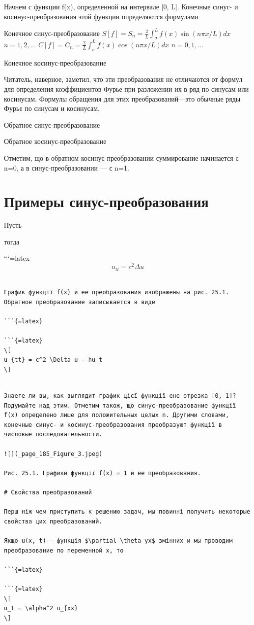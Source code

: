 \documentclass[
]{article}
\begin{document}
Начнем с функции f(x), определенной на интервале {[}0, L{]}. Конечные
синус- и косинус-преобразования этой функции определяются формулами

Конечное синус-преобразование
\(S[f] = S_n = \frac{2}{L} \int_{\sigma}^{L} f(x) \sin(n\pi x/L) dx\)
\(n = 1, 2, \dots\)
\(C[f] = C_n = \frac{2}{L} \int_{\sigma}^{L} f(x) \cos(n\pi x/L) dx\)
\(n = 0, 1, \dots\)

Конечное косинус-преобразование

Читатель, наверное, заметил, что эти преобразования не отличаются от
формул для определения коэффициентов Фурье при разложении их в ряд по
синусам или косинусам. Формулы обращения для этих преобразований---это
обычные ряды Фурье по синусам и косинусам.

Обратное синус-преобразование

Обратное косинус-преобразование

Отметим, що в обратном косинус-преобразовании суммирование начинается с
n=0, а в синус-преобразовании --- с n=1.

\section{Примеры
синус-преобразования}\label{ux43fux440ux438ux43cux435ux440ux44b-ux441ux438ux43dux443ux441-ux43fux440ux435ux43eux431ux440ux430ux437ux43eux432ux430ux43dux438ux44f}

Пусть

тогда

```{=latex}
\[
u_{tt} = c^2 \Delta u
\]

\begin{verbatim}

График функції f(x) и ее преобразования изображены на рис. 25.1. Обратное преобразование записывается в виде

```{=latex}

```{=latex}
\[
u_{tt} = c^2 \Delta u - hu_t
\]
\end{verbatim}

\begin{verbatim}

Знаете ли вы, как выглядит график цієї функції ене отрезка [0, 1]? Подумайте над этим. Отметим також, що синус-преобразование функції f(x) определено лише для положительных целых n. Другими словами, конечные синус- и косинус-преобразования преобразуют функції в числовые последовательности.

![](_page_185_Figure_3.jpeg)

Рис. 25.1. Графики функції f(x) = 1 и ее преобразования.

# Свойства преобразований

Перш ніж чем приступить к решению задач, мы повинні получить некоторые свойства цих преобразований.

Якщо u(x, t) — функція $\partial \theta yx$ змінних и мы проводим преобразование по переменной x, то

```{=latex}

```{=latex}
\[
u_t = \alpha^2 u_{xx}
\]
\end{verbatim}
\end{document}
